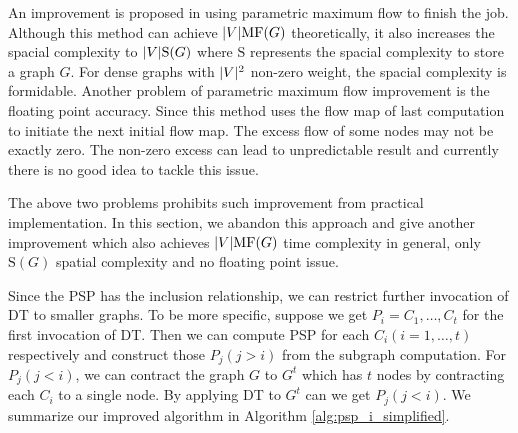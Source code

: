 \documentclass[runningheads]{llncs}
\begin{document}
An improvement is proposed in \cite{RN4} using parametric maximum flow to finish the job. Although this method can achieve $\lvert V\rvert \textrm{MF}(G)$ theoretically, it also increases the spacial complexity to $ \lvert V\rvert \textrm{S}(G)$ where $\textrm{S}$ represents the spacial complexity to store a graph $G$. For dense graphs with $\lvert V\rvert^2$ non-zero weight, the spacial complexity is formidable. 
Another problem of parametric maximum flow improvement is the floating point accuracy. Since this method uses the flow map of last computation to initiate the next initial flow map. The excess flow of some nodes may not be exactly zero. The non-zero excess can lead to unpredictable result and currently there is no good idea to tackle this issue. 

The above two problems prohibits such improvement from practical implementation. In this section, we abandon this approach and give another improvement which also achieves $\lvert V\rvert \textrm{MF}(G)$ time complexity in general, only $\textrm{S}(G)$ spatial complexity and no floating point issue.

Since the PSP has the inclusion relationship, we can restrict further invocation of DT to smaller graphs. To be more specific, suppose we get $P_i = {C_1, \dots, C_t}$ for the first invocation of DT. Then we can compute PSP for each $C_i(i=1,\dots, t)$ respectively and construct those $P_j(j>i)$ from the subgraph computation. For $P_j(j<i)$, we can contract the graph $G$  to $G^t$ which has $t$ nodes by contracting each $C_i$ to a single node. By applying DT to $G^t$ can we get $P_j(j<i)$. We summarize our improved algorithm in Algorithm \ref{alg:psp_i_simplified}.
\end{document}
